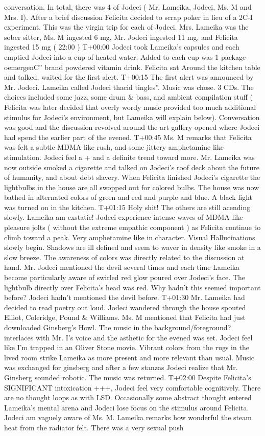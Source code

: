 \documentclass[12pt]{book}
\begin{document}
conversation. In total, there was 4 of Jodeci ( Mr. Lameika, Jodeci, Ms. M and Mrs. I). After a brief discussion Felicita decided to scrap poker in lieu of a 2C-I experiment. This was the virgin trip for each of Jodeci. Mrs. Lameika was the sober sitter, Ms. M ingested 6 mg, Mr. Jodeci ingested 11 mg, and Felicita ingested 15 mg ( 22:00 ) T+00:00 Jodeci took Lameika's capsules and each emptied Jodeci into a cup of heated water. Added to each cup was 1 package oemergenC'' brand powdered vitamin drink. Felicita sat Around the kitchen table and talked, waited for the first alert. T+00:15 The first alert was announced by Mr. Jodeci. Lameika called Jodeci thacid tingles''. Music was chose. 3 CDs. The choices included some jazz, some drum \& bass, and ambient compilation stuff ( Felicita was later decided that overly wordy music provided too much additional stimulus for Jodeci's environment, but Lameika will explain below). Conversation was good and the discussion revolved around the art gallery opened where Jodeci had spend the earlier part of the evened. T+00:45 Ms. M remarks that Felicita was felt a subtle MDMA-like rush, and some jittery amphetamine like stimulation. Jodeci feel a + and a definite trend toward more. Mr. Lameika was now outside smoked a cigarette and talked on Jodeci's roof deck about the future of humanity, and about debt slavery. When Felicita finished Jodeci's cigarette the lightbulbs in the house are all swopped out for colored bulbs. The house was now bathed in alternated colors of green and red and purple and blue. A black light was turned on in the kitchen. T+01:15 Holy shit! The others are still acending slowly. Lameika am exstatic! Jodeci experience intense waves of MDMA-like pleasure jolts ( without the extreme empathic component ) as Felicita continue to climb toward a peak. Very amphetamine like in character. Visual Hallucinations slowly begin. Shadows are ill defined and seem to waver in density like smoke in a slow breeze. The awareness of colors was directly related to the discussion at hand. Mr. Jodeci mentioned the devil several times and each time Lameika become particularly aware of swirled red glow poured over Jodeci's face. The lightbulb directly over Felicita's head was red. Why hadn't this seemed important before? Jodeci hadn't mentioned the devil before. T+01:30 Mr. Lameika had decided to read poetry out loud. Jodeci wandered through the house spouted Elliot, Coleridge, Pound \& Williams. Ms. M mentioned that Felicita had just downloaded Ginsberg's Howl. The music in the background/foreground? interlaces with Mr. I's voice and the asthetic for the evened was set. Jodeci feel like I'm trapped in an Oliver Stone movie. Vibrant colors from the rugs in the lived room strike Lameika as more present and more relevant than usual. Music was exchanged for ginsberg and after a few stanzas Jodeci realize that Mr. Ginsberg sounded robotic. The music was returned. T+02:00 Despite Felicita's SIGNIFICANT intoxication +++, Jodeci feel very comfortable cognitively. There are no thought loops as with LSD. Occasionally some abstract thought entered Lameika's mental arena and Jodeci lose focus on the stimulus around Felicita. Jodeci am vaguely aware of Ms. M. Lameika remarks how wonderful the steam heat from the radiator felt. There was a very sexual push 
\end{document}
